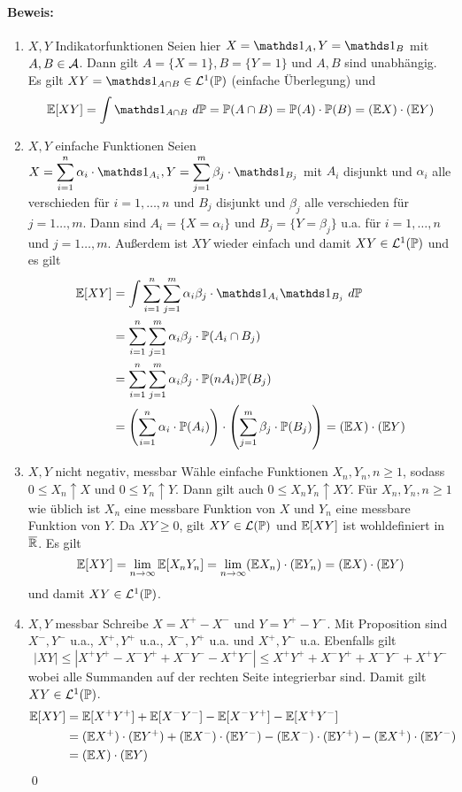 \documentclass[12pt]{report}
\begin{document}
\paragraph{Beweis:}
\begin{enumerate}[label=\Roman*.]
    \item $X,Y$ Indikatorfunktionen\newline
    Seien hier $X=\ind{A},Y=\ind{B}$ mit $A,B\in\mathcal{A}$. Dann gilt $A=\{X=1\},B=\{Y=1\}$ und $A,B$ sind unabh\"angig. Es gilt $XY=\ind{A\cap B}\in\mathcal{L}^1(\Pp)$ (einfache \"Uberlegung) und 
    $$\E [XY]=\int \ind{A\cap B}\ d\Pp=\Pp(A\cap B)=\Pp(A)\cdot \Pp(B)=(\E X)\cdot(\E Y)$$
    \item $X,Y$ einfache Funktionen\newline
    Seien $X=\displaystyle\sum_{i=1}^n\alpha_i\cdot\ind{A_i},Y=\sum_{j=1}^m\beta_j\cdot\ind{B_j}$ mit $A_i$ disjunkt und $\alpha_i$ alle verschieden f\"ur $i=1,\hdots,n$ und $B_j$ disjunkt und $\beta_j$ alle verschieden f\"ur $j=1\hdots,m$. Dann sind $A_i=\{X=\alpha_i\}$ und $B_j=\{Y=\beta_j\}$ u.a. f\"ur $i=1,\hdots,n$ und $j=1\hdots,m$. Au\ss{}erdem ist $XY$ wieder einfach und damit $XY\in\mathcal{L}^1(\mathbb{P})$ und es gilt
    \begin{align*}
        \E[XY]&=\int \sum_{i=1}^n\sum_{j=1}^m\alpha_i\beta_j\cdot\ind{A_i}\ind{B_j}\ d\Pp\\
        &=\sum_{i=1}^n\sum_{j=1}^m\alpha_i\beta_j\cdot\Pp(A_i\cap B_j)\\
        &=\sum_{i=1}^n\sum_{j=1}^m\alpha_i\beta_j\cdot\Pp(nA_i)\Pp(B_j)\\
        &=\left(\sum_{i=1}^n\alpha_i\cdot\Pp(A_i)\right)\cdot \left(\sum_{j=1}^m\beta_j\cdot\Pp(B_j)\right)=(\E X)\cdot(\E Y)
    \end{align*}
    \item $X,Y$ nicht negativ, messbar\newline
    W\"ahle einfache Funktionen $X_n,Y_n,n\geq1$, sodass $0\leq X_n\uparrow X$ und $0\leq Y_n\uparrow Y$. Dann gilt auch $0\leq X_nY_n\uparrow XY$. F\"ur $X_n,Y_n,n\geq1$ wie \"ublich ist $X_n$ eine messbare Funktion von $X$ und $Y_n$ eine messbare Funktion von $Y$. Da $XY\geq0$, gilt $XY\in\mathcal{L}(\mathbb{P})$ und $\mathbb{E}[XY]$ ist wohldefiniert in $\overline{\mathbb{R}}$. Es gilt
    $$\mathbb{E} [XY]=\lim_{n\to\infty}\mathbb{E}[X_nY_n]=\lim_{n\to\infty}(\mathbb{E} X_n)\cdot(\mathbb{E} Y_n)=(\mathbb{E} X)\cdot(\mathbb{E} Y)$$
    und damit $XY\in\mathcal{L}^1(\mathbb{P})$. 
    \item $X,Y$ messbar\newline
    Schreibe $X=X^+-X^-$ und $Y=Y^+-Y^-$. Mit Proposition sind $X^-,Y^-$ u.a., $X^+,Y^+$ u.a., $X^-,Y^+$ u.a. und $X^+,Y^-$ u.a. Ebenfalls gilt
    $$|XY|\leq|X^+Y^+-X^-Y^++X^-Y^--X^+Y^-|\leq X^+Y^++X^-Y^++X^-Y^-+X^+Y^-$$
    wobei alle Summanden auf der rechten Seite integrierbar sind. Damit gilt $XY\in\mathcal{L}^1(\mathbb{P})$.
    \begin{align*}
        \mathbb{E}[XY]&=\mathbb{E}[X^+Y^+]+\mathbb{E}[X^-Y^-]-\mathbb{E}[X^-Y^+]-\mathbb{E}[X^+Y^-]\\
        &=(\mathbb{E} X^+)\cdot(\mathbb{E} Y^+)+(\mathbb{E} X^-)\cdot(\mathbb{E} Y^-)-(\mathbb{E} X^-)\cdot(\mathbb{E} Y^+)-(\mathbb{E} X^+)\cdot(\mathbb{E} Y^-)\\
        &=(\mathbb{E} X)\cdot(\mathbb{E} Y)
    \end{align*}
    \qed
\end{enumerate}
\end{document}
